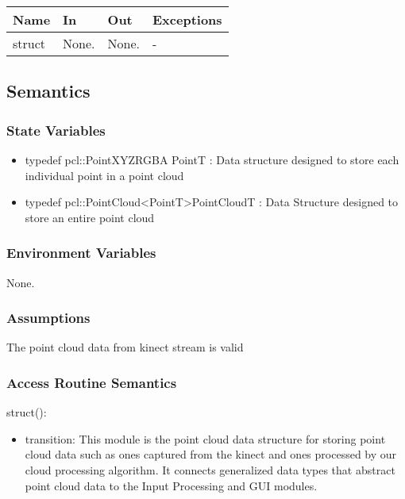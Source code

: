 \documentclass[12pt, titlepage]{article}
\begin{document}
\begin{center}
\begin{tabular}{p{3cm} p{4cm} p{4cm} p{2cm}}
\hline
\textbf{Name} & \textbf{In} & \textbf{Out} & \textbf{Exceptions} \\
\hline
struct & None. & None. & - \\
\hline
\end{tabular}
\end{center}

\subsection{Semantics}

\subsubsection{State Variables}

\begin{itemize}
\item typedef pcl::PointXYZRGBA PointT : Data structure designed to store each individual point in a point cloud 
\item typedef pcl::PointCloud\textless PointT\textgreater PointCloudT : Data Structure designed to store an entire point cloud
\end{itemize}

\subsubsection{Environment Variables}

None.

\subsubsection{Assumptions}

The point cloud data from kinect stream is valid

\subsubsection{Access Routine Semantics}

\noindent struct():
\begin{itemize}
\item transition: This module is the point cloud data structure for storing point cloud data such as ones captured from the kinect and ones processed by our cloud processing algorithm. It connects generalized data types that abstract point cloud data to the Input Processing and GUI modules.
\end{itemize}
\end{document}
